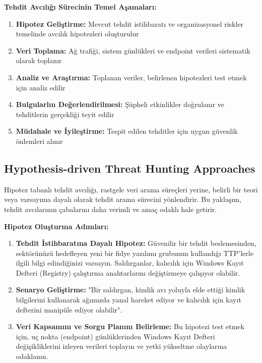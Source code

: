 \textbf{Tehdit Avcılığı Sürecinin Temel Aşamaları:}
\begin{enumerate}
    \item \textbf{Hipotez Geliştirme:} Mevcut tehdit istihbaratı ve organizasyonel riskler temelinde avcılık hipotezleri oluşturulur
    \item \textbf{Veri Toplama:} Ağ trafiği, sistem günlükleri ve endpoint verileri sistematik olarak toplanır
    \item \textbf{Analiz ve Araştırma:} Toplanan veriler, belirlenen hipotezleri test etmek için analiz edilir
    \item \textbf{Bulgularlın Değerlendirilmesi:} Şüpheli etkinlikler doğrulanır ve tehditlerin gerçekliği teyit edilir
    \item \textbf{Müdahale ve İyileştirme:} Tespit edilen tehditler için uygun güvenlik önlemleri alınır
\end{enumerate}

\subsection{Hypothesis-driven Threat Hunting Approaches}

Hipotez tabanlı tehdit avcılığı, rastgele veri arama süreçleri yerine, belirli bir teori veya varsayıma dayalı olarak tehdit arama sürecini yönlendirir. Bu yaklaşım, tehdit avcılarının çabalarını daha verimli ve amaç odaklı hale getirir.

\textbf{Hipotez Oluşturma Adımları:}

\begin{enumerate}
    \item \textbf{Tehdit İstihbaratına Dayalı Hipotez:} Güvenilir bir tehdit beslemesinden, sektörünüzü hedefleyen yeni bir fidye yazılımı grubunun kullandığı TTP'lerle ilgili bilgi edindiğinizi varsayın. Saldırganlar, kalıcılık için Windows Kayıt Defteri (Registry) çalıştırma anahtarlarını değiştirmeye çalışıyor olabilir.
    \item \textbf{Senaryo Geliştirme:} "Bir saldırgan, kimlik avı yoluyla elde ettiği kimlik bilgilerini kullanarak ağımızda yanal hareket ediyor ve kalıcılık için kayıt defterini manipüle ediyor olabilir".
    \item \textbf{Veri Kapsamını ve Sorgu Planını Belirleme:} Bu hipotezi test etmek için, uç nokta (endpoint) günlüklerinden Windows Kayıt Defteri değişikliklerini izleyen verileri toplayın ve yetki yükseltme olaylarına odaklanın.
\end{enumerate}


